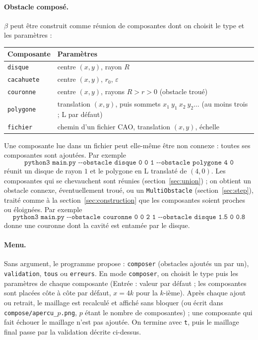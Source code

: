 \documentclass[11pt,a4paper]{article}
\begin{document}
\paragraph{Obstacle composé.} $\beta$ peut être construit comme réunion de
composantes dont on choisit le type et les paramètres :
\begin{center}
\begin{tabular}{ll}
\hline
Composante & Paramètres \\
\hline
\texttt{disque}    & centre $(x, y)$, rayon $R$ \\
\texttt{cacahuete} & centre $(x, y)$, $r_0$, $\varepsilon$ \\
\texttt{couronne}  & centre $(x, y)$, rayons $R > r > 0$ (obstacle troué) \\
\texttt{polygone}  & translation $(x, y)$, puis sommets $x_1\ y_1\ x_2\ y_2 \dots$
                     (au moins trois ; L par défaut) \\
\texttt{fichier}   & chemin d'un fichier CAO, translation $(x, y)$, échelle \\
\hline
\end{tabular}
\end{center}
Une composante lue dans un fichier peut elle-même être non connexe : toutes
ses composantes sont ajoutées. Par exemple
\[
\texttt{python3 main.py -{}-obstacle disque 0 0 1 -{}-obstacle polygone 4 0}
\]
réunit un disque de rayon $1$ et le polygone en L translaté de $(4, 0)$. Les
composantes qui se chevauchent sont réunies (section~\ref{sec:union}) ; on
obtient un obstacle connexe, éventuellement troué, ou un
\texttt{MultiObstacle} (section~\ref{sec:step}), traité comme à la
section~\ref{sec:construction} que les composantes soient proches ou
éloignées. Par exemple
\[
\texttt{python3 main.py -{}-obstacle couronne 0 0 2 1 -{}-obstacle disque 1.5 0 0.8}
\]
donne une couronne dont la cavité est entamée par le disque.

\paragraph{Menu.} Sans argument, le programme propose : \texttt{composer}
(obstacles ajoutés un par un), \texttt{validation}, \texttt{tous} ou
\texttt{erreurs}. En mode
\texttt{composer}, on choisit le type puis les paramètres de chaque
composante (Entrée : valeur par défaut ; les composantes sont placées côte
à côte par défaut, $x = 4k$ pour la $k$-ième). Après chaque ajout ou retrait,
le maillage est recalculé et affiché sans bloquer (ou écrit dans
\texttt{compose/apercu\_$p$.png}, $p$ étant le nombre de composantes) ;
une composante qui fait échouer le maillage n'est pas ajoutée. On termine
avec \texttt{t}, puis le maillage final passe par la validation décrite
ci-dessus.
\end{document}
